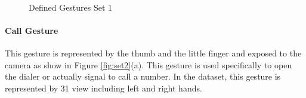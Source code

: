 \documentclass[12pt,fleqn]{book} %
\begin{document}
\begin{figure}[h]
\begin{dBox}
\centering
  \mbox{
   }
   \caption{Defined Gestures Set 1 \label{fig:set1} }   
\end{dBox}   
\end{figure}

\paragraph{Call Gesture}
This gesture is represented by the thumb and the little finger and exposed to the camera as show in Figure \ref{fig:set2}(a). This gesture is used specifically to open the dialer or actually signal to call a number. In the dataset, this gesture is represented by 31 view including left and right hands.
\end{document}

